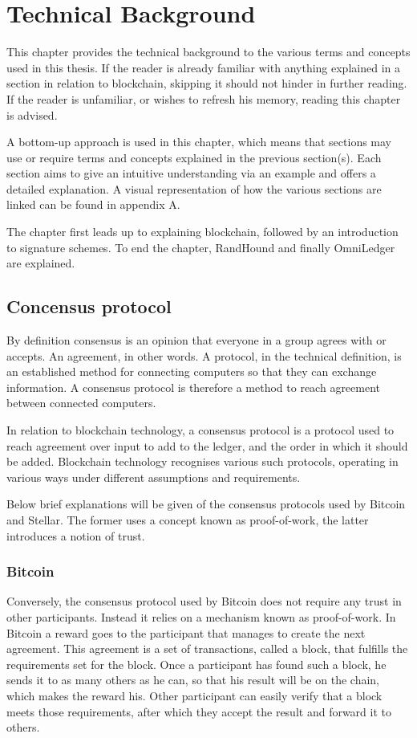 \chapter{Technical Background}
This chapter provides the technical background to the various terms and concepts used in this thesis. If the reader is already familiar with anything explained in a section in relation to blockchain, skipping it should not hinder in further reading. If the reader is unfamiliar, or wishes to refresh his memory, reading this chapter is advised.

A bottom-up approach is used in this chapter, which means that sections may use or require terms and concepts explained in the previous section(s). Each section aims to give an intuitive understanding via an example and offers a detailed explanation. A visual representation of how the various sections are linked can be found in appendix A.

The chapter first leads up to explaining blockchain, followed by an introduction to signature schemes. To end the chapter, RandHound and finally OmniLedger are explained.

\section{Concensus protocol}\textsl{}
By definition consensus is an opinion that everyone in a group agrees with or accepts. An agreement, in other words. A protocol, in the technical definition, is an established method for connecting computers so that they can exchange information. A consensus protocol is therefore a method to reach agreement between connected computers.

In relation to blockchain technology, a consensus protocol \cite{IBMConsensus} is a protocol used to reach agreement over input to add to the ledger, and the order in which it should be added. Blockchain technology recognises various such protocols, operating in various ways under different assumptions and requirements.

Below brief explanations will be given of the consensus protocols used by Bitcoin and Stellar. The former uses a concept known as proof-of-work, the latter introduces a notion of trust.

\subsection{Bitcoin}
Conversely, the consensus protocol used by Bitcoin \cite{Bitcoin} does not require any trust in other participants. Instead it relies on a mechanism known as proof-of-work. In Bitcoin a reward goes to the participant that manages to create the next agreement. This agreement is a set of transactions, called a block, that fulfills the requirements set for the block. Once a participant has found such a block, he sends it to as many others as he can, so that his result will be on the chain, which makes the reward his. Other participant can easily verify that a block meets those requirements, after which they accept the result and forward it to others.

